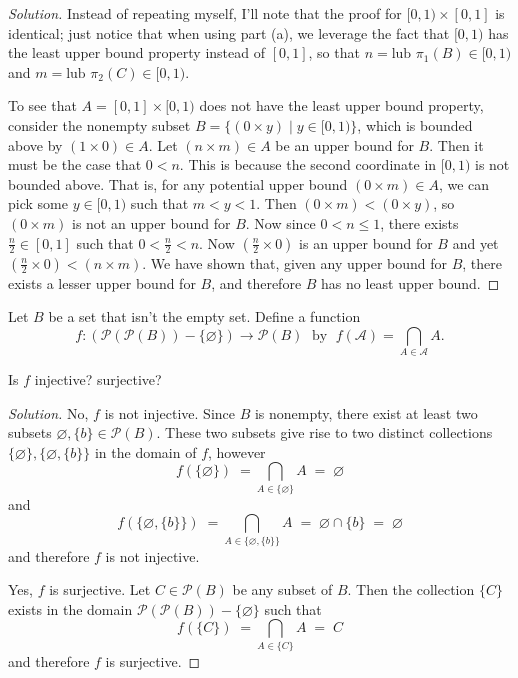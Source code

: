\documentclass[11pt]{article}
\newenvironment{p}[1]{
  \begin{trivlist}
\item[\hskip \labelsep {\bfseries (#1)}]}
  {\end{trivlist}}
\newenvironment{ex'}[1][Exercise]{
  \begin{trivlist}
    \item[\hskip \labelsep {\bfseries #1.}]}
  {\end{trivlist}}
\newenvironment{solution}{\begin{proof}[Solution]}{\end{proof}}
\begin{document}
\begin{solution}
  Instead of repeating myself, I'll note that the proof for $[0,1) \times [0, 1]$ is
  identical; just notice that when using part (a), we leverage the fact that $[0,1)$ has
  the least upper bound property instead of $[0,1]$, so that $n = \text{lub } \pi_1(B) \in
  [0, 1)$ and $m = \text{lub } \pi_2(C) \in [0, 1)$.

  To see that $A = [0, 1] \times [0, 1)$ does not have the least upper bound property,
  consider the nonempty subset $B = \{ (0 \times y) \mid y \in [0, 1) \}$, which is
  bounded above by $(1 \times 0) \in A$. Let
  $(n \times m) \in A$ be an upper bound for $B$. Then it
  must be the case that $0 < n$. This is because the second coordinate in $[0, 1)$ is not
  bounded above.  That is, for any potential upper bound $(0 \times m) \in A$, we can pick
  some $y \in [0, 1)$ such that $m < y < 1$. Then $(0 \times m) < (0 \times y)$, so $(0
  \times m)$ is not an upper bound for $B$. Now since $0 < n \le 1$, there exists $\frac{n}{2}
  \in [0, 1]$ such that $0 < \frac{n}{2} < n$. Now $(\frac{n}{2} \times 0)$ is
  an upper bound for $B$ and yet $(\frac{n}{2} \times 0) < (n \times m)$. We have shown
  that, given any upper bound for $B$, there exists a lesser upper bound for $B$, and
  therefore $B$ has no least upper bound.
\end{solution}

\vspace{.8em}
\vspace{.8em}

\begin{ex'}
  Let $B$ be a set that isn't the empty set. Define a function
  $$f : (\mathscr{P}(\mathscr{P}(B)) - \{\varnothing\}) \to \mathscr{P}(B)
  \;\text{ by }\;
  f(\mathcal{A}) = \bigcap_{A \in \mathcal{A}} A.$$
\end{ex'}

\begin{p}{a}
  Is $f$ injective? surjective?
\end{p}

\begin{solution}
  No, $f$ is not injective. Since $B$ is nonempty, there exist at least two
  subsets $\varnothing, \{b\} \in \mathscr{P}(B).$ These two subsets give rise
  to two distinct collections $\{\varnothing\}, \{\varnothing, \{b\}\}$ in the domain of
  $f$, however
  \[
    f(\{\varnothing\}) \;= \bigcap_{A \in \{\varnothing\}} A \;=\; \varnothing \label{eq1}
  \]
  and
  \[
  f(\{\varnothing, \{b\}\})
    \;= \bigcap_{A \in \{\varnothing, \{b\}\}} A
    \;=\; \varnothing \cap \{b\} \;=\; \varnothing \label{eq2}
  \]
  and therefore $f$ is not injective.

  Yes, $f$ is surjective. Let $C \in \mathscr{P}(B)$ be any subset of $B$. Then
  the collection $\{C\}$ exists in the domain $\mathscr{P}(\mathscr{P}(B)) -
  \{\varnothing\}$ such that
  $$ f(\{C\}) \;= \bigcap_{A \in \{C\}} A \;=\; C $$
  and therefore $f$ is surjective.
\end{solution}
\end{document}
